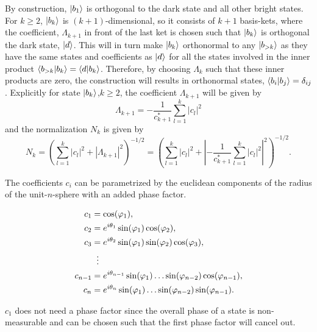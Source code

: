 By construction,  $\ket{b_1}$ is orthogonal to the dark state and all other bright states. For $k \geq 2$, $\ket{b_k}$ is $(k+1)$-dimensional, so it consists of $k+1$ basis-kets, where the coefficient, $\Lambda_{k+1}$ in front of the last ket is chosen such that $\ket{b_k}$ is orthogonal the dark state, $\ket{d}$. This will in turn make $\ket{b_k}$ orthonormal to any $\ket{b_{>k}}$ as they have the same states and coefficients as $\ket{d}$ for all the states involved in the inner product $\bra{b_{>k}}\ket{b_k} = \bra{d}\ket{b_k}$. Therefore, by choosing $\Lambda_k$ such that these inner products are zero, the construction will results in orthonormal states,  $\bra{b_i}\ket{b_j} = \delta_{ij}$. Explicitly for state $\ket{b_{k}}$,$k \geq 2$, the coefficient $\Lambda_{k+1}$ will be given by 
\begin{equation}
\Lambda_{k+1} = -\dfrac{1}{c_{k+1}^{*}}\sum_{l = 1}^{k}|c_l|^2
\end{equation}
and the normalization $N_{k}$ is given by 
\begin{equation}
N_k =  \left( \sum_{l = 1}^k|c_l|^2  + \left|\Lambda_{k+1}\right|^2 \right)^{-1/2} = \left( \sum_{l = 1}^k|c_l|^2  + \left|-\frac{1}{c_{k+1}^{*}}\sum_{l = 1}^{k} |c_l|^2 \right|^2 \right)^{-1/2}.
\end{equation}

The coefficients $c_i$ can be parametrized by the euclidean components of the radius of the unit-$n$-sphere with an added phase factor.

\begin{equation}
\begin{aligned}
c_1 &= \cos(\varphi_1),
\\ 
c_2 &= e^{i\theta_1}\sin(\varphi_1)\cos(\varphi_2),
\\ 
c_3 &= e^{i\theta_2}\sin(\varphi_1)\sin(\varphi_2)\cos(\varphi_3),
\\
&\hspace{2mm}\vdots
\\
c_{n-1} &= e^{i\theta_{n-1}}\sin(\varphi_1)\dots\sin(\varphi_{n-2})\cos(\varphi_{n-1}),
\\
c_{n} &= e^{i\theta_{n}}\sin(\varphi_1)\dots\sin(\varphi_{n-2})\sin(\varphi_{n-1}).
\end{aligned}
\end{equation}

\noindent$c_1$ does not need a phase factor since the overall phase of a state is non-measurable and can be chosen such that the first phase factor will cancel out. 


